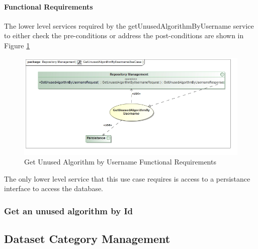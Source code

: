 \paragraph{Functional Requirements}
The lower level services required by the getUnusedAlgorithmByUsername service to either check the
pre-conditions or address the post-conditions are shown in Figure \ref{fig:getUnusedAlgorithmByUsernameUseCase}
\begin{figure}[H]
	\begin{center}
		\includegraphics[scale=0.6]{../Diagrams and Charts/Test Data/GetUnusedAlgorithmByUsernameUseCase.jpg}
		\caption{Get Unused Algorithm by Username Functional Requirements}
		\label{fig:getUnusedAlgorithmByUsernameUseCase}
	\end{center}
\end{figure}

The only lower level service that this use case requires is access to
a persistance interface to access the database.

\subsubsection {Get an unused algorithm by Id}

\subsection{Dataset Category Management}

